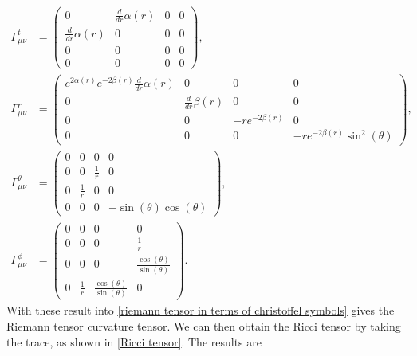 \begin{align}
    \Gamma^t_{\mu \nu}
    & =
    \left(
        \begin{matrix}
            0 & \frac{d}{d r} \alpha{\left(r \right)} & 0 & 0\\\frac{d}{d r} \alpha{\left(r \right)} & 0 & 0 & 0\\0 & 0 & 0 & 0\\0 & 0 & 0 & 0
        \end{matrix}
    \right), \\
    \Gamma^r_{\mu \nu}
    &=
    \left(
        \begin{matrix}
            e^{2 \alpha{\left(r \right)}} e^{- 2 \beta{\left(r \right)}} \frac{d}{d r} \alpha{\left(r \right)} & 0 & 0 & 0\\0 & \frac{d}{d r} \beta{\left(r \right)} & 0 & 0\\0 & 0 & - r e^{- 2 \beta{\left(r \right)}} & 0\\0 & 0 & 0 & - r e^{- 2 \beta{\left(r \right)}} \sin^{2}{\left(\theta \right)}
        \end{matrix}
     \right), \\
     \Gamma^\theta_{\mu \nu} 
     & =
     \left(
         \begin{matrix}
            0 & 0 & 0 & 0\\0 & 0 & \frac{1}{r} & 0\\0 & \frac{1}{r} & 0 & 0\\0 & 0 & 0 & - \sin{\left(\theta \right)} \cos{\left(\theta \right)}
        \end{matrix}
    \right), \\
    \Gamma^\phi_{\mu \nu} 
    &=
    \left(
        \begin{matrix}
            0 & 0 & 0 & 0\\0 & 0 & 0 & \frac{1}{r}\\0 & 0 & 0 & \frac{\cos{\left(\theta \right)}}{\sin{\left(\theta \right)}}\\0 & \frac{1}{r} & \frac{\cos{\left(\theta \right)}}{\sin{\left(\theta \right)}} & 0
        \end{matrix}
    \right).
\end{align}
%
With these result into  \autoref{riemann tensor in terms of christoffel symbols} gives the Riemann tensor curvature tensor.
We can then obtain the Ricci tensor by taking the trace, as shown in \autoref{Ricci tensor}.
The results are
%
